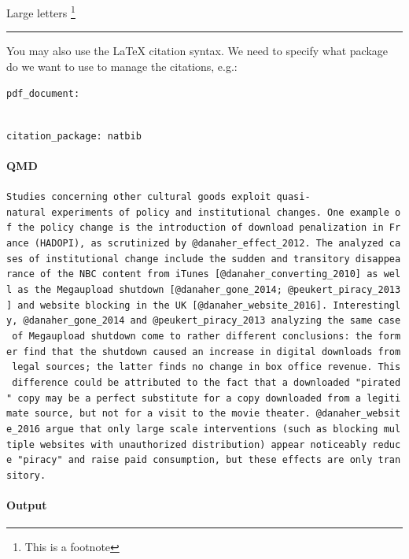 \documentclass[
  11pt,
]{article}
\let\oldparagraph\paragraph
\renewcommand{\paragraph}[1]{\oldparagraph{#1}\mbox{}}
\begin{document}
\Large Large letters \footnote{This is a footnote}

\begin{center}\rule{0.5\linewidth}{0.5pt}\end{center}

You may also use the LaTeX citation syntax. We need to specify what
package do we want to use to manage the citations, e.g.:

\texttt{pdf\_document:}\strut \\
\texttt{citation\_package:\ natbib}

\paragraph{QMD}

\texttt{Studies\ concerning\ other\ cultural\ goods\ exploit\ quasi-natural\ experiments\ of\ policy\ and\ institutional\ changes.\ One\ example\ of\ the\ policy\ change\ is\ the\ introduction\ of\ download\ penalization\ in\ France\ (HADOPI),\ as\ scrutinized\ by\ @danaher\_effect\_2012.\ The\ analyzed\ cases\ of\ institutional\ change\ include\ the\ sudden\ and\ transitory\ disappearance\ of\ the\ NBC\ content\ from\ iTunes\ {[}@danaher\_converting\_2010{]}\ as\ well\ as\ the\ Megaupload\ shutdown\ {[}@danaher\_gone\_2014;\ @peukert\_piracy\_2013{]}\ and\ website\ blocking\ in\ the\ UK\ {[}@danaher\_website\_2016{]}.\ Interestingly,\ @danaher\_gone\_2014\ and\ @peukert\_piracy\_2013\ analyzing\ the\ same\ case\ of\ Megaupload\ shutdown\ come\ to\ rather\ different\ conclusions:\ the\ former\ find\ that\ the\ shutdown\ caused\ an\ increase\ in\ digital\ downloads\ from\ legal\ sources;\ the\ latter\ finds\ no\ change\ in\ box\ office\ revenue.\ This\ difference\ could\ be\ attributed\ to\ the\ fact\ that\ a\ downloaded\ "pirated"\ copy\ may\ be\ a\ perfect\ substitute\ for\ a\ copy\ downloaded\ from\ a\ legitimate\ source,\ but\ not\ for\ a\ visit\ to\ the\ movie\ theater.\ @danaher\_website\_2016\ argue\ that\ only\ large\ scale\ interventions\ (such\ as\ blocking\ multiple\ websites\ with\ unauthorized\ distribution)\ appear\ noticeably\ reduce\ "piracy"\ and\ raise\ paid\ consumption,\ but\ these\ effects\ are\ only\ transitory.}

\paragraph{Output}
\end{document}
